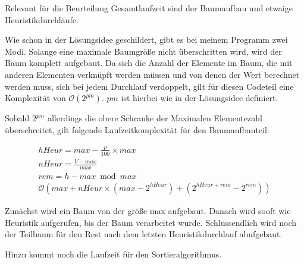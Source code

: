 Relevant für die Beurteilung Gesamtlaufzeit sind der Baumaufbau und etwaige Heuristikdurchläufe.

Wie schon in der Lösungsidee geschildert, gibt es bei meinem Programm zwei Modi. Solange eine maximale Baumgröße nicht überschritten wird, wird der Baum komplett aufgebaut.
Da sich die Anzahl der Elemente im Baum, die mit anderen Elementen verknüpft werden müssen und von denen der Wert berechnet werden muss, sich bei jedem Durchlauf verdoppelt, gilt für diesen Codeteil eine Komplexität von \(\mathcal{O}(2^{pm})\). \(pm\) ist hierbei wie in der Lösungsidee definiert. 

Sobald \(2^{pm}\) allerdings die obere Schranke der Maximalen Elementezahl überschreitet, gilt folgende Laufzeitkomplexität für den Baumaufbauteil:

\begin{gather}
	{hHeur} = max - \frac{p}{100} \times max \\
	{nHeur} = \frac{V-max}{max} \\
	{rem}   = h-max \bmod max \\
	\mathcal{O}(max+nHeur\times{}(max-2^{hHeur})+(2^{hHeur + rem}-2^{rem}))
\end{gather}

Zunächst wird ein Baum von der größe max aufgebaut. Danach wird sooft wie Heuristik aufgerufen, bis der Baum verarbeitet wurde. Schlussendlich wird noch der Teilbaum für den Rest nach dem letzten Heuristikdurchlauf abufgebaut.

Hinzu kommt noch die Laufzeit für den Sortieralgorithmus.
